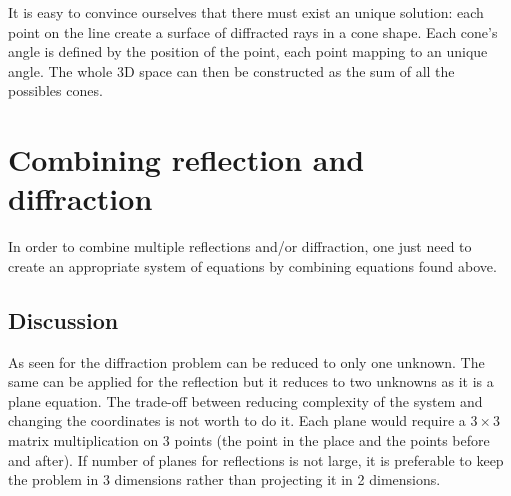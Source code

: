 \documentclass[french,10pt]{article}
\begin{document}
        It is easy to convince ourselves that there must exist an unique solution: each point on the line create a surface of diffracted rays in a cone shape. Each cone's angle is defined by the position of the point, each point mapping to an unique angle. The whole 3D space can then be constructed as the sum of all the possibles cones.

\section{Combining reflection and diffraction}

    In order to combine multiple reflections and/or diffraction, one just need to create an appropriate system of equations by combining equations found above.
    
    \subsection{Discussion}
    
        As seen for the diffraction problem can be reduced to only one unknown. The same can be applied for the reflection but it reduces to two unknowns as it is a plane equation. The trade-off between reducing complexity of the system and changing the coordinates is not worth to do it. Each plane would require a $3\times 3$ matrix multiplication on 3 points (the point in the place and the points before and after). If number of planes for reflections is not large, it is preferable to keep the problem in 3 dimensions rather than projecting it in 2 dimensions.
\end{document}
